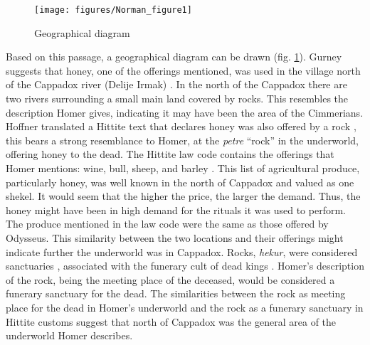 	
		\begin{figure}[!htp]
			\texttt{[image: figures/Norman\_figure1]}%
			\caption{Geographical diagram}
			\label{normann_figure1} %
		\end{figure}
\noindent Based on this passage, a geographical diagram can be drawn (fig. \ref{normann_figure1}).
Gurney suggests that honey, one of the offerings mentioned, was used in the village north of the Cappadox river (Delije Irmak) \parencite[77]{Gurney1990}. In the north of the Cappadox there are two rivers surrounding a small main land covered by rocks. This resembles the description Homer gives, indicating it may have been the area of the Cimmerians. Hoffner translated a Hittite text that declares honey was also offered by a rock \parencite[346]{Hoffner1997}, this bears a strong resemblance to Homer, at the \emph{petre} “rock” in the underworld, offering honey to the dead. The Hittite law code contains the offerings that Homer mentions: wine, bull, sheep, and barley \parencite[82]{Gurney1990}. This list of agricultural produce, particularly honey, was well known in the north of Cappadox and valued as one shekel. It would seem that the higher the price, the larger the demand. Thus, the honey might have been in high demand for the rituals it was used to perform. The produce mentioned in the law code were the same as those offered by Odysseus. This similarity between the two locations and their offerings might indicate further the underworld was in Cappadox. Rocks, \emph{hekur}, were considered sanctuaries \parencite{Slocum2014}, associated with the funerary cult of dead kings \parencite[43]{Harmansah2014}. Homer’s description of the rock, being the meeting place of the deceased, would be considered a funerary sanctuary for the dead. The similarities between the rock as meeting place for the dead in Homer’s underworld and the rock as a funerary sanctuary in Hittite customs suggest that north of Cappadox was the general area of the underworld Homer describes. 
	
